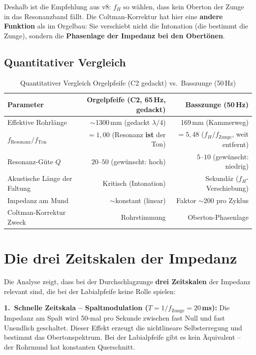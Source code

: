 \documentclass[11pt,a4paper]{article}
\begin{document}
Deshalb ist die Empfehlung aus v8: $f_H$ so wählen, dass kein Oberton der Zunge in das Resonanzband fällt. Die Coltman-Korrektur hat hier eine \textbf{andere Funktion} als im Orgelbau: Sie verschiebt nicht die Intonation (die bestimmt die Zunge), sondern die \textbf{Phasenlage der Impedanz bei den Obertönen}.

\subsection{Quantitativer Vergleich}

\begin{table}[H]
\centering\small
\begin{tabular}{l r r}
\toprule
\textbf{Parameter} & \textbf{Orgelpfeife (C2, 65\,Hz, gedackt)} & \textbf{Basszunge (50\,Hz)} \\
\midrule
Effektive Rohrlänge & $\sim$1300\,mm (gedackt $\lambda/4$) & 169\,mm (Kammerweg) \\
$f_\text{Resonanz}/f_\text{Ton}$ & $= 1{,}00$ (Resonanz \textbf{ist} der Ton) & $= 5{,}48$ ($f_H/f_\text{Zunge}$, weit entfernt) \\
Resonanz-Güte $Q$ & $20$--$50$ (gewünscht: hoch) & $5$--$10$ (gewünscht: niedrig) \\
Akustische Länge der Faltung & Kritisch (Intonation) & Sekundär ($f_H$-Verschiebung) \\
Impedanz am Mund & $\sim$konstant (linear) & Faktor $\sim$200 pro Zyklus \\
Coltman-Korrektur Zweck & Rohrstimmung & Oberton-Phasenlage \\
\bottomrule
\end{tabular}
\caption{Quantitativer Vergleich Orgelpfeife (C2 gedackt) vs.\ Basszunge (50\,Hz)}
\end{table}

\section{Die drei Zeitskalen der Impedanz}

Die Analyse zeigt, dass bei der Durchschlagzunge \textbf{drei Zeitskalen} der Impedanz relevant sind, die bei der Labialpfeife keine Rolle spielen:

\textbf{1.\ Schnelle Zeitskala -- Spaltmodulation ($T = 1/f_\text{Zunge} = 20$\,ms):} Die Impedanz am Spalt wird 50-mal pro Sekunde zwischen fast Null und fast Unendlich geschaltet. Dieser Effekt erzeugt die nichtlineare Selbsterregung und bestimmt das Obertonspektrum. Bei der Labialpfeife gibt es kein Äquivalent -- der Rohrmund hat konstanten Querschnitt.
\end{document}
